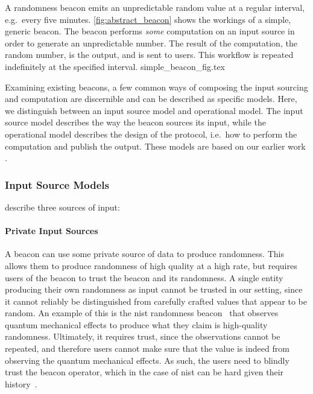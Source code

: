 A randomness beacon emits an unpredictable random value at a regular interval, e.g.\ every five minutes.
\cref{fig:abstract_beacon} shows the workings of a simple, generic beacon.
The beacon performs \emph{some} computation on an input source in order to generate an unpredictable number.
The result of the computation, the random number, is the output, and is sent to users.
This workflow is repeated indefinitely at the specified interval.
{simple_beacon_fig.tex}

Examining existing beacons, a few common ways of composing the input sourcing and computation are discernible and can be described as specific models.
Here, we distinguish between an input source model and operational model.
The input source model describes the way the beacon sources its input, while the operational model describes the design of the protocol, i.e.\ how to perform the computation and publish the output.
These models are based on our earlier work .

\subsubsection{Input Source Models}
 describe three sources of input:

\paragraph{Private Input Sources}
A beacon can use some private source of data to produce randomness.
This allows them to produce randomness of high quality at a high rate, but requires users of the beacon to trust the beacon and its randomness.
A single entity producing their own randomness as input cannot be trusted in our setting, since it cannot reliably be distinguished from carefully crafted values that appear to be random.
An example of this is the \gls{nist} randomness beacon~\cite{nistbeacon} that observes quantum mechanical effects to produce what they claim is high-quality randomness.
Ultimately, it requires trust, since the observations cannot be repeated, and therefore users cannot make sure that the value is indeed from observing the quantum mechanical effects.
As such, the users need to blindly trust the beacon operator, which in the case of \gls{nist} can be hard given their history~\cite{nytimes-nsabackdoors, nytimes-nsaconstants, nist2014backdoor}.

